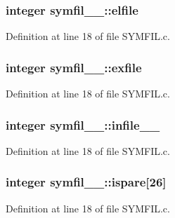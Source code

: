 \subsubsection[{\texorpdfstring{elfile}{elfile}}]{\setlength{\rightskip}{0pt plus 5cm}integer symfil\+\_\+\_\+\+::elfile}\hypertarget{structsymfil__1___afbb4371a25fc62d76506e98d02edaa2f}{}\label{structsymfil__1___afbb4371a25fc62d76506e98d02edaa2f}


Definition at line 18 of file S\+Y\+M\+F\+I\+L.\+c.

\subsubsection[{\texorpdfstring{exfile}{exfile}}]{\setlength{\rightskip}{0pt plus 5cm}integer symfil\+\_\+\_\+\+::exfile}\hypertarget{structsymfil__1___ab4d28b04f54594b97270b01c1edcc26d}{}\label{structsymfil__1___ab4d28b04f54594b97270b01c1edcc26d}


Definition at line 18 of file S\+Y\+M\+F\+I\+L.\+c.

\subsubsection[{\texorpdfstring{infile\+\_\+\+\_\+}{infile__}}]{\setlength{\rightskip}{0pt plus 5cm}integer symfil\+\_\+\_\+\+::infile\+\_\+\+\_\+}\hypertarget{structsymfil__1___a4d15d6b3cb973e0dafdba8310f1486e8}{}\label{structsymfil__1___a4d15d6b3cb973e0dafdba8310f1486e8}


Definition at line 18 of file S\+Y\+M\+F\+I\+L.\+c.

\subsubsection[{\texorpdfstring{ispare}{ispare}}]{\setlength{\rightskip}{0pt plus 5cm}integer symfil\+\_\+\_\+\+::ispare\mbox{[}26\mbox{]}}\hypertarget{structsymfil__1___a6ef7d9acc381f44f170506c70924d7da}{}\label{structsymfil__1___a6ef7d9acc381f44f170506c70924d7da}


Definition at line 18 of file S\+Y\+M\+F\+I\+L.\+c.

